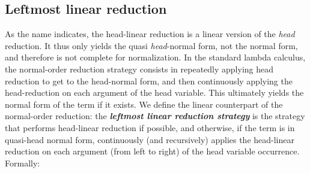 \documentclass[xchauthor,chkrefs,GCNS,amsmath,amsthm,rotating,leaveRGB]{tcsg}
\renewcommand{\index}[1]{}
\theoremstyle{plain}
\theoremstyle{definition}
\begin{document}
\subsection{Leftmost linear reduction}\label{sec6.2}

As the name indicates, the head-linear reduction is a linear version of the
\emph{head} reduction. It thus only yields the quasi \emph{head}-normal form,
not the normal form, and therefore is not complete for normalization. In the
standard lambda calculus, the normal-order reduction strategy consists in
repeatedly applying head reduction to get to the head-normal form, and then
continuously applying the head-reduction on each argument of the head
variable. This ultimately yields the normal form of the term if it exists. We
define the linear counterpart of the normal-order reduction: the
\textbf{\emph{leftmost linear reduction strategy}}\index{leftmost linear
reduction strategy} is the strategy that performs head-linear reduction if
possible, and otherwise, if the term is in quasi-head normal form,
continuously (and recursively) applies the head-linear reduction on each
argument (from left to right) of the head variable occurrence. Formally:
\end{document}
